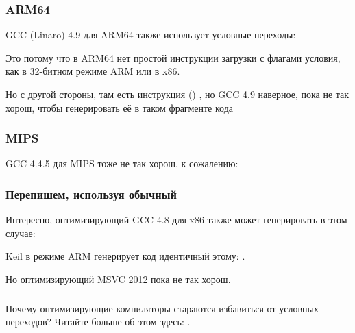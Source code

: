 

\subsubsection{ARM64}

\Optimizing GCC (Linaro) 4.9 для ARM64 также использует условные переходы:



Это потому что в ARM64 нет простой инструкции загрузки с флагами условия, как  в 32-битном 
режиме ARM или  в x86.

Но с другой стороны, там есть инструкция  ()
,
но GCC 4.9 наверное, пока не так
хорош, чтобы генерировать её в таком фрагменте кода

\subsubsection{MIPS}

GCC 4.4.5 для MIPS тоже не так хорош, к сожалению:



\subsubsection{Перепишем, используя обычный }



Интересно, оптимизирующий GCC 4.8 для x86 также может генерировать  в этом случае:



\Optimizing Keil в режиме ARM генерирует код идентичный этому: .

Но оптимизирующий MSVC 2012 пока не так хорош.

\subsubsection{\Conclusion{}}

Почему оптимизирующие компиляторы стараются избавиться от условных переходов? Читайте больше об этом здесь:
 .
